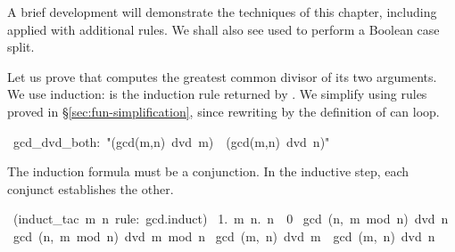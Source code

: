 %
A brief development will demonstrate the techniques of this chapter,
including  applied with additional rules.  We shall also see
 used to perform a Boolean case split.

Let us prove that  computes the greatest common
divisor of its two arguments.  
%
We use induction:  is the
induction rule returned by .  We simplify using
rules proved in {\S}\ref{sec:fun-simplification}, since rewriting by the
definition of  can loop.
\begin{isabelle}
\ gcd_dvd_both:\ "(gcd(m,n)\ dvd\ m)\ \isasymand\ (gcd(m,n)\ dvd\
n)"
\end{isabelle}
The induction formula must be a conjunction.  In the
inductive step, each conjunct establishes the other. 
\begin{isabelle}
\ (induct_tac\ m\ n\ rule:\ gcd.induct)\isanewline
\ 1.\ \isasymAnd m\ n.\ n\ \isasymnoteq \ 0\ \isasymlongrightarrow \isanewline
\isaindent{\ 1.\ \isasymAnd m\ n.\ }gcd\ (n,\ m\ mod\ n)\ dvd\ n\ \isasymand
\ gcd\ (n,\ m\ mod\ n)\ dvd\ m\ mod\ n\isanewline
{}\isasymLongrightarrow\ gcd\ (m,\ n)\
dvd\ m\ \isasymand \ gcd\ (m,\ n)\ dvd\ n%
\end{isabelle}

